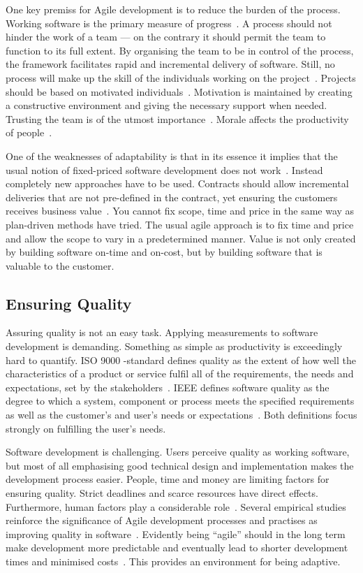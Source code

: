 \documentclass[english]{tktltiki2}
\begin{document}
One key premiss for Agile development is to reduce the burden of the process. Working software is the primary measure of progress~\cite{BBB01b}. A process should not hinder the work of a team — on the contrary it should permit the team to function to its full extent. By organising the team to be in control of the process, the framework facilitates rapid and incremental delivery of software. Still, no process will make up the skill of the individuals working on the project~\cite{Boe88, Fow05}. Projects should be based on motivated individuals~\cite{BBB01b}. Motivation is maintained by creating a constructive environment and giving the necessary support when needed. Trusting the team is of the utmost importance~\cite{BBB01b}. Morale affects the productivity of people~\cite{Fow05}.

One of the weaknesses of adaptability is that in its essence it implies that the usual notion of fixed-priced software development does not work~\cite{Pop02, Fow05}. Instead completely new approaches have to be used. Contracts should allow incremental deliveries that are not pre-defined in the contract, yet ensuring the customers receives business value~\cite{Pop02}. You cannot fix scope, time and price in the same way as plan-driven methods have tried. The usual agile approach is to fix time and price and allow the scope to vary in a predetermined manner. Value is not only created by building software on-time and on-cost, but by building software that is valuable to the customer.

\subsection{Ensuring Quality}

Assuring quality is not an easy task. Applying measurements to software development is demanding. Something as simple as productivity is exceedingly hard to quantify. ISO 9000 -standard defines quality as the extent of how well the characteristics of a product or service fulfil all of the requirements, the needs and expectations, set by the stakeholders~\cite{ISO9000}. IEEE defines software quality as the degree to which a system, component or process meets the specified requirements as well as the customer’s and user’s needs or expectations~\cite{IEEE1074}. Both definitions focus strongly on fulfilling the user’s needs.

Software development is challenging. Users perceive quality as working software, but most of all emphasising good technical design and implementation makes the development process easier. People, time and money are limiting factors for ensuring quality. Strict deadlines and scarce resources have direct effects. Furthermore, human factors play a considerable role~\cite{DD08}. Several empirical studies reinforce the significance of Agile development processes and practises as improving quality in software~\cite{DD08, SS10}. Evidently being “agile” should in the long term make development more predictable and eventually lead to shorter development times and minimised costs~\cite{DD08}. This provides an environment for being adaptive.
\end{document}
